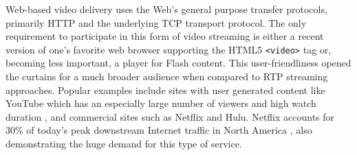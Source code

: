   
  
  









Web-based video delivery uses the Web's general purpose transfer protocols, primarily HTTP and the underlying TCP transport protocol. The only requirement to participate in this form  of video streaming is either a recent version of one's favorite web browser supporting the HTML5 \texttt{<video>} tag or, becoming less important, a player for Flash content. This user-friendliness opened the curtains for a much broader audience when compared to RTP streaming approaches. Popular examples include sites with user generated content like YouTube which has an especially large number of viewers and high watch duration \cite{comscore2011ranking}, and commercial sites such as Netflix and Hulu. Netflix accounts for 30\% of today's peak downstream Internet traffic in North America \cite{sandvine_spring2011}, also demonstrating the huge demand for this type of service.

